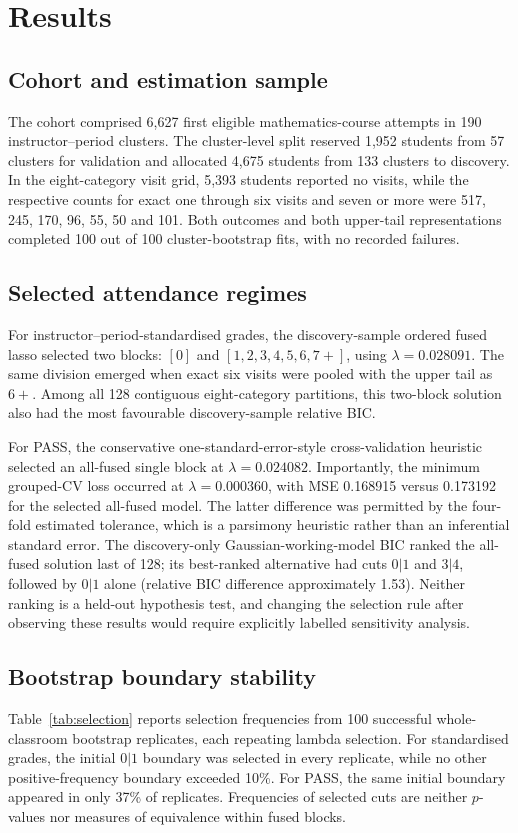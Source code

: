 \section{Results}

\subsection{Cohort and estimation sample}
The cohort comprised 6,627 first eligible mathematics-course attempts in 190 instructor--period clusters. The cluster-level split reserved 1,952 students from 57 clusters for validation and allocated 4,675 students from 133 clusters to discovery. In the eight-category visit grid, 5,393 students reported no visits, while the respective counts for exact one through six visits and seven or more were 517, 245, 170, 96, 55, 50 and 101. Both outcomes and both upper-tail representations completed 100 out of 100 cluster-bootstrap fits, with no recorded failures.

\subsection{Selected attendance regimes}
For instructor--period-standardised grades, the discovery-sample ordered fused lasso selected two blocks: $[0]$ and $[1,2,3,4,5,6,7+]$, using $\lambda=0.028091$. The same division emerged when exact six visits were pooled with the upper tail as $6+$. Among all 128 contiguous eight-category partitions, this two-block solution also had the most favourable discovery-sample relative BIC.

For PASS, the conservative one-standard-error-style cross-validation heuristic selected an all-fused single block at $\lambda=0.024082$. Importantly, the minimum grouped-CV loss occurred at $\lambda=0.000360$, with MSE 0.168915 versus 0.173192 for the selected all-fused model. The latter difference was permitted by the four-fold estimated tolerance, which is a parsimony heuristic rather than an inferential standard error. The discovery-only Gaussian-working-model BIC ranked the all-fused solution last of 128; its best-ranked alternative had cuts $0|1$ and $3|4$, followed by $0|1$ alone (relative BIC difference approximately 1.53). Neither ranking is a held-out hypothesis test, and changing the selection rule after observing these results would require explicitly labelled sensitivity analysis.

\subsection{Bootstrap boundary stability}
Table~\ref{tab:selection} reports selection frequencies from 100 successful whole-classroom bootstrap replicates, each repeating lambda selection. For standardised grades, the initial $0|1$ boundary was selected in every replicate, while no other positive-frequency boundary exceeded 10\%. For PASS, the same initial boundary appeared in only 37\% of replicates. Frequencies of selected cuts are neither $p$-values nor measures of equivalence within fused blocks.

